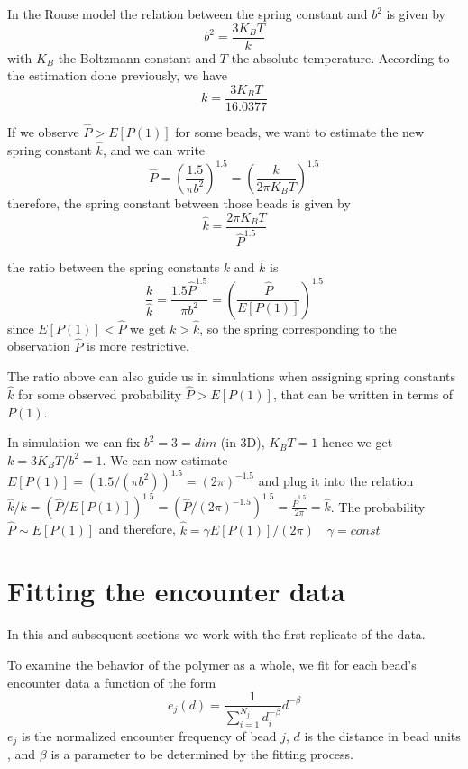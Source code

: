 \documentclass[12pt]{book}
\begin{document}
In the Rouse model the relation between the spring constant and $b^2$ is given by 
\begin{equation*}
b^2=\frac{3K_BT}{k} 
\end{equation*}
with $K_B$ the Boltzmann constant and $T$ the absolute temperature. According to the estimation done previously, we have 
\begin{equation*}
k = \frac{3K_BT}{16.0377}
\end{equation*}
 
If we observe $\hat{P}>E[P(1)]$ for some beads, we want to estimate the new spring constant $\hat{k}$, and we can write 
\begin{equation*}
\hat{P}=\left(\frac{1.5}{\pi b^2}\right)^{1.5} = \left(\frac{k}{2\pi K_BT} \right)^{1.5}
\end{equation*}
therefore, the spring constant between those beads is given by 
\begin{equation*}
\hat{k} = \frac{2\pi K_BT}{\hat{P}^{1.5}}
\end{equation*}

the ratio between the spring constants $k$ and $\hat{k}$ is 
\begin{equation*}
\frac{k}{\hat{k}}= \frac{1.5\hat{P}^{1.5}}{\pi b^2}=\left(\frac{\hat{P}}{E[P(1)]} \right)^{1.5}
\end{equation*}
since $E[P(1)]<\hat{P}$ we get $k>\hat{k}$, so the spring corresponding to the observation $\hat{P}$ is more restrictive. 

The ratio above can also guide us in simulations when assigning spring constants $\hat{k}$ for some observed probability $\hat{P}>E[P(1)]$, that can be written in terms of $P(1)$. 

In simulation we can fix $b^2 = 3 = dim$ (in 3D), $K_BT = 1$ hence we get $k=3K_BT/b^2=1$. We can now estimate $E[P(1)]=(1.5/(\pi b^2))^{1.5}=(2\pi)^{-1.5}$ and plug it into the relation $\hat{k}/k=(\hat{P}/E[P(1)])^{1.5}=(\hat{P}/(2\pi)^{-1.5})^{1.5}= \frac{\hat{P}^{1.5}}{2\pi}=\hat{k}$. The probability $\hat{P}\sim E[P(1)]$ and therefore, $\hat{k}=\gamma E[P(1)]/(2\pi)\quad \gamma=const$

\section{Fitting the encounter data}\label{section_fittingTheEncounterData}
In this and subsequent sections we work with the first replicate of the data.

To examine the behavior of the polymer as a whole, we fit for each bead's encounter data 
a function of the form 
\begin{equation}\label{equation_fitModel}
e_j(d)= \frac{1}{\sum_{i=1}^{N_j}d_i^{-\beta}}d^{-\beta}
\end{equation}
$e_j$ is the normalized encounter frequency of bead $j$, $d$ is the distance in bead units , and $\beta$ is a parameter to be determined by the fitting process. 
\end{document}
